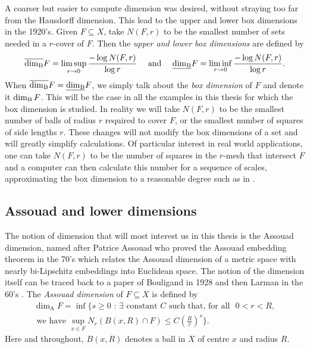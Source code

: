 A coarser but easier to compute dimension was desired, without straying too far from the Hausdorff dimension. This lead to the upper and lower box dimensions in the 1920's. Given $F\subseteq X$, take $N(F,r)$ to be the smallest number of sets needed in a $r$-cover of $F$. Then the \textit{upper and lower box dimensions} are defined by
\[
\overline{\dim_{\textup{B}}} F = \limsup_{r \rightarrow 0} \frac{-\log N(F,r)}{\log r}   \quad \text{ and } \quad \underline{\dim_{\textup{B}}} F = \liminf_{r \rightarrow 0} \frac{-\log N(F,r)}{\log r}. 
\]
 When $\overline{\dim_{\textup{B}}} F = \underline{\dim_{\textup{B}}} F$, we simply talk about the \textit{box dimension} of $F$ and denote it $\dim_{\textup{B}} F$. This will be the case in all the examples in this thesis for which the box dimension is studied. In reality we will take $N(F,r)$ to be the smallest number of balls of radius $r$ required to cover $F$, or the smallest number of squares of side lengths $r$. These changes will not modify the box dimensions of a set and will greatly simplify calculations. Of particular interest in real world applications, one can take $N(F,r)$ to be the number of squares in the $r$-mesh that intersect $F$ and a computer can then calculate this number for a sequence of scales, approximating the box dimension to a reasonable degree such as in \cite{diieva}.




\subsection{Assouad and lower dimensions}
\label{sec:intro-ass}

The notion of dimension that will most interest us in this thesis is the Assouad dimension, named after Patrice Assouad who proved the Assouad embedding theorem in the 70's \cite{assouad1, assouad2} which relates the Assouad dimension of a metric space with nearly bi-Lipschitz embeddings into Euclidean space. The notion of the dimension itself can be traced back to a paper of Bouligand in 1928 \cite{bouligand} and then Larman in the 60's \cite{larman1,larman2}. The \textit{Assouad dimension} of $F \subseteq X$ is defined by 
\begin{multline*}
\dim_{\text{A}} F = \inf \Bigg\{ s \geq 0 \, \,  : \, \exists \text{ constant } C \text{ such that, for all } \, \, 0< r< R,\\ \text{ we have  }\sup_{x\in F} N_r (B(x,R)\cap F) \leq C\left(\frac{R}{r}\right)^{s} \Bigg\}.
\end{multline*}
Here and throughout, $B(x,R)$ denotes a ball in $X$ of centre $x$ and radius $R$.

